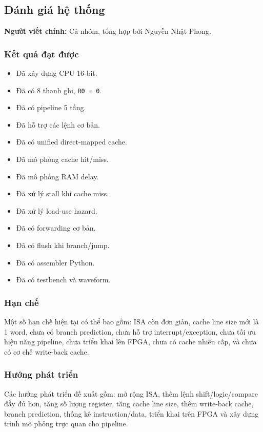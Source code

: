 \documentclass[11pt,a4paper]{article}
\theoremstyle{definition}
\theoremstyle{remark}
\begin{document}
	\subsection{Đánh giá hệ thống}
	\textbf{Người viết chính:} Cả nhóm, tổng hợp bởi Nguyễn Nhật Phong.
	
	\subsubsection{Kết quả đạt được}
	\begin{itemize}
		\item Đã xây dựng CPU 16-bit.
		\item Đã có 8 thanh ghi, \texttt{R0 = 0}.
		\item Đã có pipeline 5 tầng.
		\item Đã hỗ trợ các lệnh cơ bản.
		\item Đã có unified direct-mapped cache.
		\item Đã mô phỏng cache hit/miss.
		\item Đã mô phỏng RAM delay.
		\item Đã xử lý stall khi cache miss.
		\item Đã xử lý load-use hazard.
		\item Đã có forwarding cơ bản.
		\item Đã có flush khi branch/jump.
		\item Đã có assembler Python.
		\item Đã có testbench và waveform.
	\end{itemize}
	
	\subsubsection{Hạn chế}
	Một số hạn chế hiện tại có thể bao gồm: ISA còn đơn giản, cache line size mới là 1 word, chưa có branch prediction, chưa hỗ trợ interrupt/exception, chưa tối ưu hiệu năng pipeline, chưa triển khai lên FPGA, chưa có cache nhiều cấp, và chưa có cơ chế write-back cache.
	
	\subsubsection{Hướng phát triển}
	Các hướng phát triển đề xuất gồm: mở rộng ISA, thêm lệnh shift/logic/compare đầy đủ hơn, tăng số lượng register, tăng cache line size, thêm write-back cache, branch prediction, thống kê instruction/data, triển khai trên FPGA và xây dựng trình mô phỏng trực quan cho pipeline.
	
\end{document}
